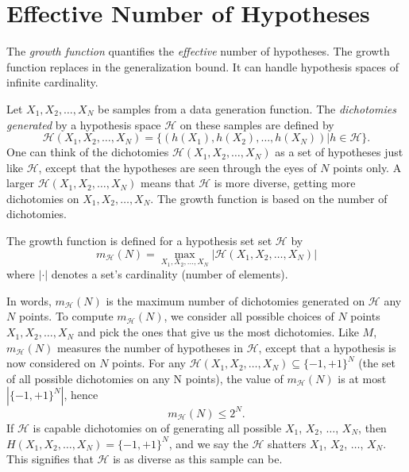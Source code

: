 \documentclass{tufte-handout}
\begin{document}
\section{Effective Number of Hypotheses}

The {\em growth function } quantifies the {\em effective} number of hypotheses. The growth function replaces in the generalization bound. It can handle hypothesis spaces of infinite cardinality.


Let $X_1, X_2, \dots, X_N$ be samples from a data generation function. The {\em dichotomies generated} by a hypothesis space $\mathcal H$ on these samples are defined by
\begin{equation*}
\mathcal H(X_1, X_2, \dots, X_N) = \{ \left(h(X_1),h(X_2), \dots, h(X_N) \right)| h \in \mathcal H\}.
\end{equation*}
One can think of the dichotomies $\mathcal H(X_1, X_2, \dots, X_N)$ as a set of hypotheses just like $\mathcal H$, except that the hypotheses are seen through the eyes of $N$ points only. A larger $\mathcal H(X_1, X_2, \dots, X_N)$ means that $\mathcal H$ is more diverse, getting more dichotomies on $X_1, X_2, \dots, X_N$. The growth function is based on the number of dichotomies.

The growth function is defined for a hypothesis set set $\mathcal H$ by
\begin{equation*}
m_{\mathcal H}(N) = \max_{X_1, X_2, \dots, X_N} | \mathcal H(X_1, X_2, \dots, X_N)|
\end{equation*}
where $|\cdot|$ denotes a set's cardinality (number of elements).

In words, $m_{\mathcal H}(N)$ is the maximum number of dichotomies generated on $\mathcal H $ any $N$ points. To compute $m_{\mathcal H}(N)$, we consider all possible choices of $N$ points $X_1, X_2, \dots, X_N$ and pick the ones that give us the most dichotomies. Like $M$, $m_{\mathcal H}(N)$ measures the number of hypotheses in $\mathcal H$, except that a hypothesis is now considered on $N$ points. For any $\mathcal H(X_1, X_2, \dots, X_N)\subseteq \{-1,+1\}^N$ (the set of all possible dichotomies on any N points), the value of  $m_{\mathcal H}(N)$ is at most $|\{-1,+1\}^N|$, hence 
\begin{equation*}
m_{\mathcal H}(N) \leq 2^N.
\end{equation*}
If $\mathcal H$ is capable dichotomies on  of generating all possible $X_1$, $X_2$, $\dots$, $X_N$, then $H(X_1, X_2, \dots, X_N)= \{-1,+1\}^N$, and we say the $\mathcal H$ shatters $X_1$, $X_2$, $\dots$, $X_N$.  This signifies that $\mathcal H$ is as diverse as this sample can be.
\end{document}
